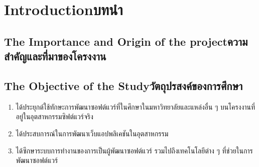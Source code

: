 \chapter{\ifenglish Introduction\else บทนำ\fi}

\section{\ifenglish The Importance and Origin of the 
project\else ความสำคัญและที่มาของโครงงาน\fi}

\section{\ifenglish The Objective of the Study\else วัตถุปรสงค์ของการศึกษา\fi}
\begin{enumerate}
    \item ได้ประยุกต์ใช้ทักษะการพัฒนาซอฟต์แวร์ที่ในศึกษาในมหาวิทยาลัยและแหล่งอื่น ๆ บนโครงงานที่อยู่ในอุตสาหกรรมซิฟต์แวร์จริง
    \item ได้ประสบการณ์ในการพัฒนาเว็บแอปพลิเคชันในอุตสาหกรรม
    \item ได้ซึกษาระบบการทำงานของการเป็นผู้พัฒนาซอฟต์แวร์ รวมไปถึงเทคโนโลยีต่าง ๆ ที่ช่วยในการพัฒนาซอฟต์แวร์
\end{enumerate}